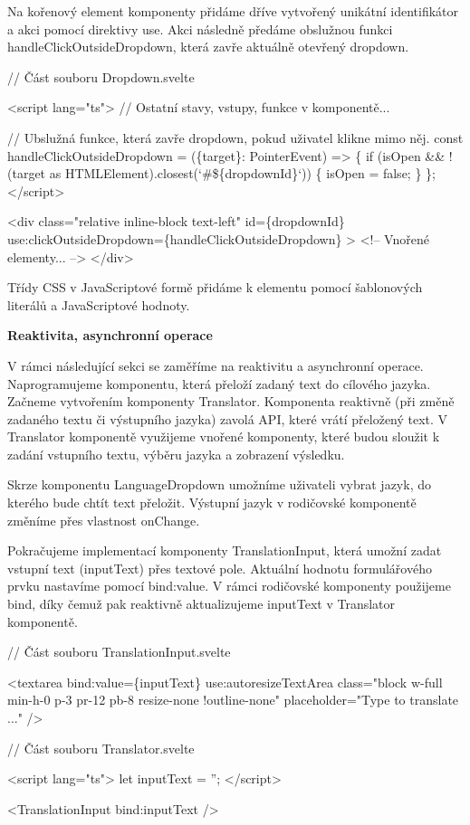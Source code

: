 Na kořenový element komponenty přidáme dříve vytvořený unikátní identifikátor a akci pomocí direktivy use. 
Akci následně předáme obslužnou funkci handleClickOutsideDropdown, která zavře aktuálně otevřený dropdown.

\begin{prog}
// Část souboru Dropdown.svelte

<script lang="ts">
  // Ostatní stavy, vstupy, funkce v komponentě...

  // Ubslužná funkce, která zavře dropdown, pokud uživatel klikne mimo něj.
  const handleClickOutsideDropdown = (\{target\}: PointerEvent) => \{
    if (isOpen && !(target as HTMLElement).closest(`#\$\{dropdownId\}`)) \{
      isOpen = false;
    \}
  \};
</script>
  
<div
  class="relative inline-block text-left"
  id=\{dropdownId\}
  use:clickOutsideDropdown=\{handleClickOutsideDropdown\}
>
  <!-- Vnořené elementy... -->
</div>
\end{prog}

Třídy CSS v JavaScriptové formě přidáme k elementu pomocí šablonových literálů a JavaScriptové hodnoty.

\begin{flushleft}
  \textbf{Reaktivita, asynchronní operace}
\end{flushleft}

V rámci následující sekci se zaměříme na reaktivitu a asynchronní operace. Naprogramujeme komponentu, která přeloží zadaný text do cílového jazyka. 
Začneme vytvořením komponenty Translator. Komponenta reaktivně (při změně zadaného textu či výstupního jazyka) zavolá API, které vrátí přeložený text. 
V Translator komponentě využijeme vnořené komponenty, které budou sloužit k zadání vstupního textu, výběru jazyka a zobrazení výsledku.

Skrze komponentu LanguageDropdown umožníme uživateli vybrat jazyk, do kterého bude chtít text přeložit. Výstupní jazyk v rodičovské komponentě změníme přes vlastnost onChange.

Pokračujeme implementací komponenty TranslationInput, která umožní zadat vstupní text (inputText) přes textové pole. Aktuální hodnotu formulářového prvku nastavíme pomocí bind:value. 
V rámci rodičovské komponenty použijeme bind, díky čemuž pak reaktivně aktualizujeme inputText v Translator komponentě.

\begin{prog}
// Část souboru TranslationInput.svelte

<textarea
  bind:value=\{inputText\}
  use:autoresizeTextArea
  class="block w-full min-h-0 p-3 pr-12 pb-8 resize-none !outline-none"
  placeholder="Type to translate ..."
/>

// Část souboru Translator.svelte

<script lang="ts">
  let inputText = '';
</script>

<TranslationInput bind:inputText />
\end{prog}

